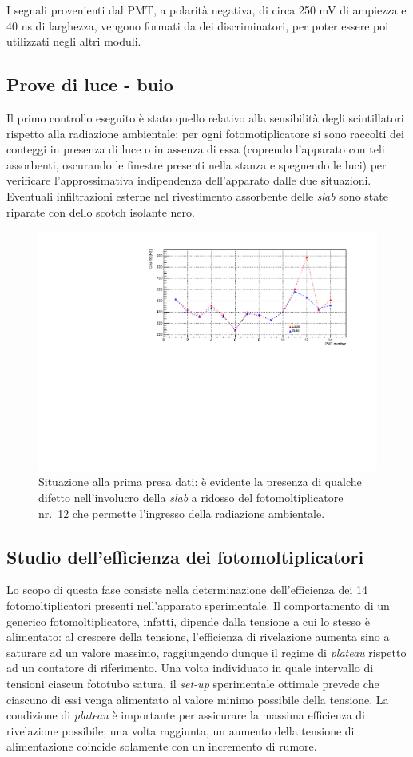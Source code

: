 \documentclass[10pt, oneside, a4paper]{article}   	%
\begin{document}
I segnali provenienti dal PMT, a polarità negativa, di circa 250 mV di ampiezza e 40 ns di larghezza, vengono formati da dei discriminatori, per poter essere poi utilizzati negli altri moduli.
%
%
\subsection{Prove di luce - buio}
Il primo controllo eseguito è stato quello relativo alla sensibilità degli scintillatori rispetto alla radiazione ambientale: per ogni fotomotiplicatore si sono raccolti dei conteggi in presenza di luce o in assenza di essa (coprendo l'apparato con teli assorbenti, oscurando le finestre presenti nella stanza e spegnendo le luci) per verificare l'approssimativa indipendenza dell'apparato dalle due situazioni. Eventuali infiltrazioni esterne nel rivestimento assorbente delle \emph{slab} sono state riparate con dello scotch isolante nero. 
%
\begin{figure}[h]
	\centering
	\includegraphics[scale=0.6]{img/luce_buio_100s.pdf}
	\caption{Situazione alla prima presa dati: è evidente la presenza di qualche difetto  nell'involucro della \emph{slab} a ridosso del fotomoltiplicatore nr.~12 che permette l'ingresso della radiazione ambientale.}
\end{figure}
%
\subsection{Studio dell'efficienza dei fotomoltiplicatori}
Lo scopo di questa fase consiste nella determinazione dell'efficienza dei 14 fotomoltiplicatori presenti nell'apparato sperimentale. Il comportamento di un generico fotomoltiplicatore, infatti, dipende dalla tensione a cui lo stesso è alimentato: al crescere della tensione, l'efficienza di rivelazione aumenta sino a saturare ad un valore massimo, raggiungendo dunque il regime di \textit{plateau} rispetto ad un contatore di riferimento.
Una volta individuato in quale intervallo di tensioni ciascun fototubo satura, il \emph{set-up} sperimentale ottimale prevede che ciascuno di essi venga alimentato al valore minimo possibile della tensione. 
La condizione di \textit{plateau} è importante per assicurare la massima efficienza di rivelazione possibile; una volta raggiunta, un aumento della tensione di alimentazione coincide solamente con un incremento di rumore.  
\end{document}
